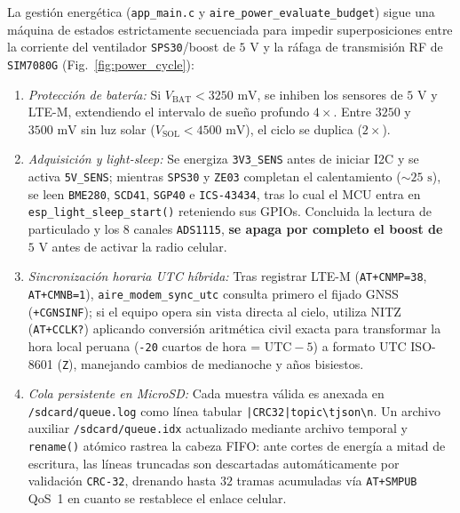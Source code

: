 \documentclass[conference]{IEEEtran}
\begin{document}
La gestión energética (\texttt{app\_main.c} y \texttt{aire\_power\_evaluate\_budget}) sigue una máquina de estados estrictamente secuenciada para impedir superposiciones entre la corriente del ventilador \texttt{SPS30}/boost de $5\text{ V}$ y la ráfaga de transmisión RF de \texttt{SIM7080G} (Fig.~\ref{fig:power_cycle}):
\begin{enumerate}
    \item \emph{Protección de batería:} Si $V_{\mathrm{BAT}} < 3250\text{ mV}$, se inhiben los sensores de $5\text{ V}$ y LTE-M, extendiendo el intervalo de sueño profundo $4\times$. Entre $3250$ y $3500\text{ mV}$ sin luz solar ($V_{\mathrm{SOL}} < 4500\text{ mV}$), el ciclo se duplica ($2\times$).
    \item \emph{Adquisición y light-sleep:} Se energiza \texttt{3V3\_SENS} antes de iniciar I2C y se activa \texttt{5V\_SENS}; mientras \texttt{SPS30} y \texttt{ZE03} completan el calentamiento ($\sim 25\text{ s}$), se leen \texttt{BME280}, \texttt{SCD41}, \texttt{SGP40} e \texttt{ICS-43434}, tras lo cual el MCU entra en \texttt{esp\_light\_sleep\_start()} reteniendo sus GPIOs. Concluida la lectura de particulado y los 8 canales \texttt{ADS1115}, \textbf{se apaga por completo el boost de $5\text{ V}$} antes de activar la radio celular.
    \item \emph{Sincronización horaria UTC híbrida:} Tras registrar LTE-M (\texttt{AT+CNMP=38}, \texttt{AT+CMNB=1}), \texttt{aire\_modem\_sync\_utc} consulta primero el fijado GNSS (\texttt{+CGNSINF}); si el equipo opera sin vista directa al cielo, utiliza NITZ (\texttt{AT+CCLK?}) aplicando conversión aritmética civil exacta para transformar la hora local peruana (\texttt{-20} cuartos de hora = $\text{UTC}-5$) a formato UTC ISO-8601 (\texttt{Z}), manejando cambios de medianoche y años bisiestos.
    \item \emph{Cola persistente en MicroSD:} Cada muestra válida es anexada en \texttt{/sdcard/queue.log} como línea tabular \texttt{|CRC32|topic\textbackslash tjson\textbackslash n}. Un archivo auxiliar \texttt{/sdcard/queue.idx} actualizado mediante archivo temporal y \texttt{rename()} atómico rastrea la cabeza FIFO: ante cortes de energía a mitad de escritura, las líneas truncadas son descartadas automáticamente por validación \texttt{CRC-32}, drenando hasta $32$ tramas acumuladas vía \texttt{AT+SMPUB} QoS~1 en cuanto se restablece el enlace celular.
\end{enumerate}
\end{document}
